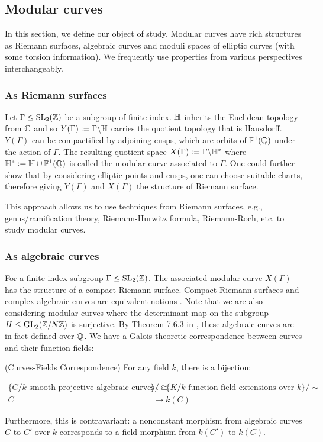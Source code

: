 
\subsection{Modular curves}
In this section, we define our object of study. Modular curves have rich structures as Riemann surfaces, algebraic curves and moduli spaces of elliptic curves (with some torsion information). We frequently use properties from various perspectives interchangeably.

\subsubsection{As Riemann surfaces}
Let $\Gamma \leq \operatorname{SL}_2(\mathbb{Z})$ be a subgroup of finite index. $\mathbb{H}$ inherits the Euclidean topology from $\mathbb{C}$ and so $Y(\Gamma) := \Gamma \backslash \mathbb{H}$ carries the quotient topology that is Hausdorff. $Y(\Gamma)$ can be compactified by adjoining cusps, which are orbits of $\mathbb{P}^1(\mathbb{Q})$ under the action of $\Gamma$. The resulting quotient space $X(\Gamma) := \Gamma \backslash \mathbb{H}^*$ where $\mathbb{H}^* := \mathbb{H} \cup \mathbb{P}^1(\mathbb{Q})$ is called the modular curve associated to $\Gamma$. One could further show that by considering elliptic points and cusps, one can choose suitable charts, therefore giving $Y(\Gamma)$ and $X(\Gamma)$ the structure of Riemann surface.

This approach allows us to use techniques from Riemann surfaces, e.g., genus/ramification theory, Riemann-Hurwitz formula, Riemann-Roch, etc. to study modular curves.

\subsubsection{As algebraic curves}

For a finite index subgroup $\Gamma \leq \operatorname{SL}_2(\mathbb{Z})$. The associated modular curve $X(\Gamma)$ has the structure of a compact Riemann surface. Compact Riemann surfaces and complex algebraic curves are equivalent notions \cite{forster}. Note that we are also considering modular curves where the determinant map on the subgroup $H \leq \operatorname{GL}_2(\mathbb{Z}/N\mathbb{Z})$ is surjective. By Theorem 7.6.3 in \cite{Shurman}, these algebraic curves are in fact defined over $\mathbb{Q}$. We have a Galois-theoretic correspondence between curves and their function fields:

\begin{theorem}{(Curves-Fields Correspondence)} For any field $k$, there is a bijection:

\begin{align*}
\{\text{$C/k$ smooth projective algebraic curves}\}/\cong &\leftrightarrow \{\text{$K/k$ function field extensions over $k$}\}/\sim \\
C &\mapsto k(C)
\end{align*}

Furthermore, this is contravariant: a nonconstant morphism from  algebraic curves $C$ to $C'$ over $k$ corresponds to a field morphism from $k(C')$ to $k(C)$.

\end{theorem}

